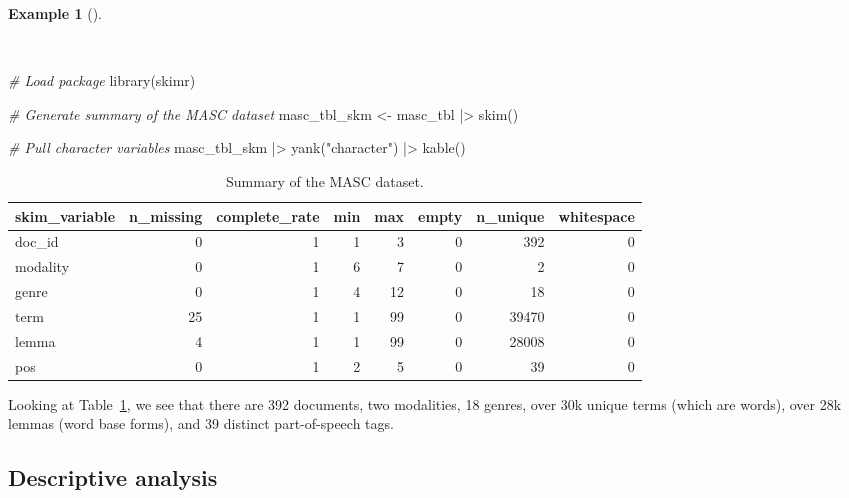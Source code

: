 \documentclass[
  letterpaper,
  DIV=11,
  numbers=noendperiod]{scrreport}
\newenvironment{Shaded}{\begin{snugshade}}{\end{snugshade}}
\newcommand{\CommentTok}[1]{\textcolor[rgb]{0.00,0.00,0.00}{\textit{#1}}}
\newcommand{\FunctionTok}[1]{\textcolor[rgb]{0.00,0.00,0.00}{#1}}
\newcommand{\NormalTok}[1]{\textcolor[rgb]{0.00,0.00,0.00}{#1}}
\newcommand{\OtherTok}[1]{\textcolor[rgb]{0.00,0.00,0.00}{#1}}
\newcommand{\SpecialCharTok}[1]{\textcolor[rgb]{0.00,0.00,0.00}{#1}}
\newcommand{\StringTok}[1]{\textcolor[rgb]{0.00,0.00,0.00}{#1}}
\theoremstyle{definition}
\newtheorem{example}{Example}[chapter]
\theoremstyle{remark}
\begin{document}
\begin{example}[]\protect\hypertarget{exm-eda-masc-skim}{}\label{exm-eda-masc-skim}

~

\begin{Shaded}
\begin{Highlighting}[]
\CommentTok{\# Load package}
\FunctionTok{library}\NormalTok{(skimr)}

\CommentTok{\# Generate summary of the MASC dataset}
\NormalTok{masc\_tbl\_skm }\OtherTok{\textless{}{-}} 
\NormalTok{  masc\_tbl }\SpecialCharTok{|\textgreater{}} 
  \FunctionTok{skim}\NormalTok{()}

\CommentTok{\# Pull character variables}
\NormalTok{masc\_tbl\_skm }\SpecialCharTok{|\textgreater{}} 
  \FunctionTok{yank}\NormalTok{(}\StringTok{"character"}\NormalTok{) }\SpecialCharTok{|\textgreater{}} 
  \FunctionTok{kable}\NormalTok{()}
\end{Highlighting}
\end{Shaded}

\hypertarget{tbl-exm-eda-masc-skim}{}
\begin{table}
\caption{\label{tbl-exm-eda-masc-skim}Summary of the MASC dataset. }\tabularnewline

\centering
\begin{tabular}{l|r|r|r|r|r|r|r}
\hline
skim\_variable & n\_missing & complete\_rate & min & max & empty & n\_unique & whitespace\\
\hline
doc\_id & 0 & 1 & 1 & 3 & 0 & 392 & 0\\
\hline
modality & 0 & 1 & 6 & 7 & 0 & 2 & 0\\
\hline
genre & 0 & 1 & 4 & 12 & 0 & 18 & 0\\
\hline
term & 25 & 1 & 1 & 99 & 0 & 39470 & 0\\
\hline
lemma & 4 & 1 & 1 & 99 & 0 & 28008 & 0\\
\hline
pos & 0 & 1 & 2 & 5 & 0 & 39 & 0\\
\hline
\end{tabular}
\end{table}

\end{example}

Looking at Table~\ref{tbl-exm-eda-masc-skim}, we see that there are 392
documents, two modalities, 18 genres, over 30k unique terms (which are
words), over 28k lemmas (word base forms), and 39 distinct
part-of-speech tags.

\hypertarget{sec-eda-descriptive}{%
\subsection{Descriptive analysis}\label{sec-eda-descriptive}}
\end{document}
